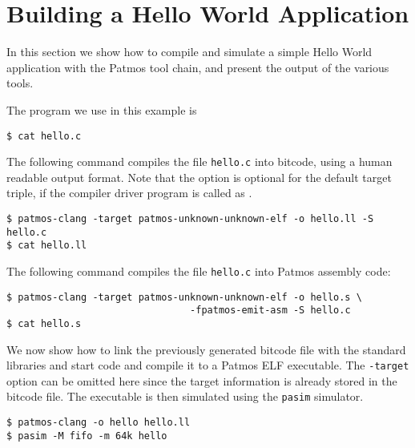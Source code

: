 \chapter{Building a Hello World Application}

In this section we show how to compile and simulate a simple Hello World application with the Patmos tool chain, and present the output of the
various tools.

The program we use in this example is
\footnotesize
\begin{verbatim}
$ cat hello.c
\end{verbatim}


\normalsize
The following command compiles the file \texttt{hello.c} into bitcode, using a human readable output format.
Note that the  option is optional for the default target triple, if the compiler driver program is called as
.
\footnotesize
\begin{verbatim}
$ patmos-clang -target patmos-unknown-unknown-elf -o hello.ll -S hello.c
$ cat hello.ll
\end{verbatim}


\normalsize
The following command compiles the file \texttt{hello.c} into Patmos assembly code:
\footnotesize
\begin{verbatim}
$ patmos-clang -target patmos-unknown-unknown-elf -o hello.s \
                                -fpatmos-emit-asm -S hello.c
$ cat hello.s
\end{verbatim}


\normalsize
We now show how to link the previously generated bitcode file with the standard libraries and start code and compile it to a Patmos ELF
executable. The \texttt{-target} option can be omitted here since the target information is already stored in the bitcode file. 
The executable is then simulated using the \texttt{pasim} simulator.
\footnotesize
\begin{verbatim}
$ patmos-clang -o hello hello.ll
$ pasim -M fifo -m 64k hello
\end{verbatim}


\normalsize


